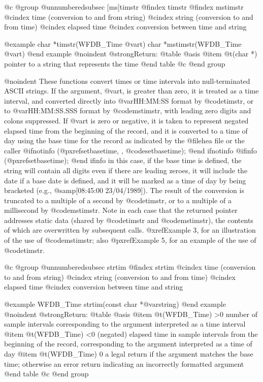 {{{{{{{{@c @group
@unnumberedsubsec [ms]timstr
@findex timstr
@findex mstimstr
@cindex time (conversion to and from string)
@cindex string (conversion to and from time)
@cindex elapsed time
@cindex conversion between time and string

@example
char *timstr(WFDB_Time @var{t})
char *mstimstr(WFDB_Time @var{t})
@end example
@noindent
@strong{Return:}
@table @asis
@item @t{(char *)}
pointer to a string that represents the time
@end table
@c @end group

@noindent
These functions convert times or time intervals into null-terminated
ASCII strings.  If the argument, @var{t}, is greater than zero, it is
treated as a time interval, and converted directly into @var{HH:MM:SS}
format by @code{timstr}, or to @var{HH:MM:SS.SSS} format by
@code{mstimstr}, with leading zero digits and colons suppressed.  If
@var{t} is zero or negative, it is taken to represent negated elapsed
time from the beginning of the record, and it is converted to a time of
day using the base time for the record as indicated by the @file{hea}
file or the caller
@ifnotinfo
(@pxref{setbasetime, , @code{setbasetime}});
@end ifnotinfo
@ifinfo
(@pxref{setbasetime});
@end ifinfo
in this case, if the base time is defined, the string will contain all
digits even if there are leading zeroes, it will include the date if a
base date is defined, and it will be marked as a time of day by being
bracketed (e.g., @samp{[08:45:00 23/04/1989]}).  The result of the
conversion is truncated to a multiple of a second by @code{timstr}, or
to a multiple of a millisecond by @code{mstimstr}.  Note in each case
that the returned pointer addresses static data (shared by @code{timstr}
and @code{mstimstr}), the contents of which are overwritten by
subsequent calls.  @xref{Example 3}, for an illustration of the use of
@code{mstimstr}; also @pxref{Example 5}, for an example of the use of
@code{timstr}.

@c @group
@unnumberedsubsec strtim
@findex strtim
@cindex time (conversion to and from string)
@cindex string (conversion to and from time)
@cindex elapsed time
@cindex conversion between time and string

@example
WFDB_Time strtim(const char *@var{string})
@end example
@noindent
@strong{Return:}
@table @asis
@item @t{(WFDB_Time) >0}
number of sample intervals corresponding to the argument interpreted as
a time interval
@item @t{(WFDB_Time) <0}
(negated) elapsed time in sample intervals from the beginning of the record,
corresponding to the argument interpreted as a time of day
@item @t{(WFDB_Time)  0}
a legal return if the argument matches the base time;  otherwise an error
return indicating an incorrectly formatted argument
@end table
@c @end group

}}}}}}}}
